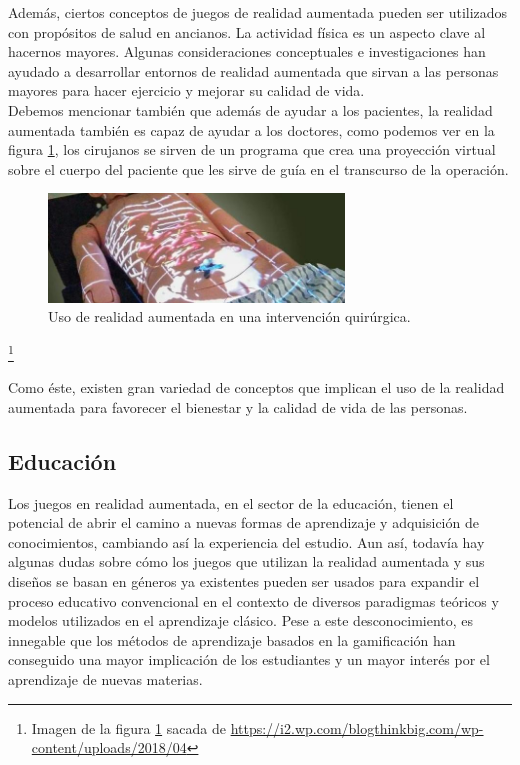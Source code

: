Además, ciertos conceptos de juegos de realidad aumentada pueden ser utilizados con propósitos de salud en ancianos. La actividad física es un aspecto clave al hacernos mayores. Algunas consideraciones conceptuales e investigaciones han ayudado a desarrollar entornos de realidad aumentada que sirvan a las personas mayores para hacer ejercicio y mejorar su calidad de vida.\\

Debemos mencionar también que además de ayudar a los pacientes, la realidad aumentada también es capaz de ayudar a los doctores, como podemos ver en la figura \ref{fig:Surgeon}, los cirujanos se sirven de un programa que crea una proyección virtual sobre el cuerpo del paciente que les sirve de guía en el transcurso de la operación.

\begin{figure}[H]
     \centering
     \includegraphics[width=0.7\textwidth]{Images/medicina_AR.jpg}
     \caption{Uso de realidad aumentada en una intervención quirúrgica.}
     \label{fig:Surgeon}
 \end{figure}
 {\let\thefootnote\relax\footnote{{Imagen de la figura \ref{fig:Surgeon} sacada de \url{https://i2.wp.com/blogthinkbig.com/wp-content/uploads/2018/04}}}}

Como éste, existen gran variedad de conceptos que implican el uso de la realidad aumentada para favorecer el bienestar y la calidad de vida de las personas.\cite{ARGames_Gamification}
\subsection{Educación}
Los juegos en realidad aumentada, en el sector de la educación, tienen el potencial de abrir el camino a nuevas formas de aprendizaje y adquisición de conocimientos, cambiando así la experiencia del estudio. Aun así, todavía hay algunas dudas sobre cómo los juegos que utilizan la realidad aumentada y sus diseños se basan en géneros ya existentes pueden ser usados para expandir el proceso educativo convencional en el contexto de diversos paradigmas teóricos y modelos utilizados en el aprendizaje clásico. Pese a este desconocimiento, es innegable que los métodos de aprendizaje basados en la gamificación han conseguido una mayor implicación de los estudiantes y un mayor interés por el aprendizaje de nuevas materias.\cite{ARGames_Gamification}\\

